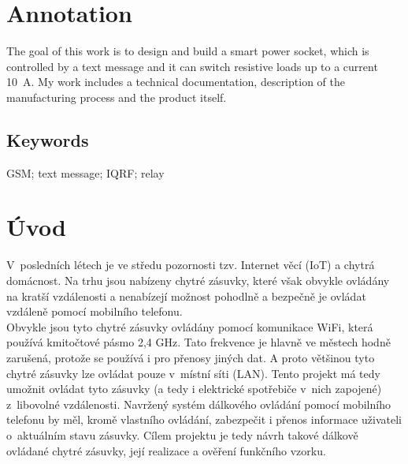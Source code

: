 \documentclass[12pt,a4paper,oneside]{article}
\begin{document}
\section*{Annotation}

The goal of this work is to design and build a smart power socket, which is controlled by a text message and it can switch resistive loads up to a current 10~A. My work includes a technical documentation, description of the manufacturing process and the product itself.

\subsection*{Keywords}

GSM; text message; IQRF; relay

\newpage

\setcounter{page}{1}

\tableofcontents

\newpage

\pagestyle{plain}

\section*{Úvod}


V~posledních létech je ve středu pozornosti tzv. Internet věcí (IoT) a chytrá domácnost. Na trhu jsou nabízeny chytré zásuvky, které však obvykle ovládány na kratší vzdálenosti a nenabízejí možnost pohodlně a bezpečně je ovládat vzdáleně pomocí mobilního telefonu. \\

Obvykle jsou tyto chytré zásuvky ovládány pomocí komunikace WiFi, která používá kmitočtové pásmo 2,4 GHz. Tato frekvence je hlavně ve městech hodně zarušená, protože se používá i pro přenosy jiných dat\cite{wiki-ism-band}. A proto většinou tyto chytré zásuvky lze ovládat pouze v~místní síti (LAN). Tento projekt má tedy umožnit ovládat tyto zásuvky (a tedy i elektrické spotřebiče v~nich zapojené) z~libovolné vzdálenosti. Navržený systém dálkového ovládání pomocí mobilního telefonu by měl, kromě vlastního ovládání, zabezpečit i přenos informace uživateli o~aktuálním stavu zásuvky. Cílem projektu je tedy návrh takové dálkově ovládané chytré zásuvky, její realizace a ověření funkčního vzorku. \\
\end{document}

